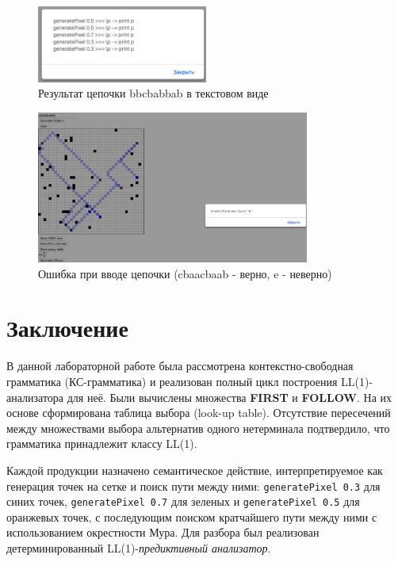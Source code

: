 \documentclass[areasetadvanced]{scrartcl}
\begin{document}
\begin{figure}[H]
  \centering
  \includegraphics[width=0.5\textwidth]{images/restext.png}
  \caption{Результат цепочки bbcbabbab в текстовом виде}
  \label{fig:result}
\end{figure}

\begin{figure}[H]
  \centering
  \includegraphics[width=0.8\textwidth]{images/image.png}
  \caption{Ошибка при вводе цепочки (cbaacbaab - верно, e - неверно)}
  \label{fig:image}
\end{figure}

\newpage
\section*{Заключение}
В данной лабораторной работе была рассмотрена контекстно-свободная грамматика
(КС-грамматика) и реализован полный цикл построения LL(1)-анализатора
для неё.  
Были вычислены множества \textbf{FIRST} и \textbf{FOLLOW}.
На их основе сформирована таблица выбора (look-up table).
Отсутствие пересечений между множествами выбора альтернатив одного
нетерминала подтвердило, что грамматика принадлежит классу LL(1).

Каждой продукции назначено семантическое действие,
интерпретируемое как генерация точек на сетке и поиск пути между ними:
\texttt{generatePixel 0.3} для синих точек, \texttt{generatePixel 0.7} для зеленых
и \texttt{generatePixel 0.5} для оранжевых точек, с последующим поиском
кратчайшего пути между ними с использованием окрестности Мура.
\medskip
Для разбора был реализован детерминированный LL(1)-\emph{предиктивный анализатор}.
\end{document}
